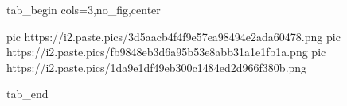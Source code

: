  
 
 
 
 


\ifcmt
  tab_begin cols=3,no_fig,center

     pic https://i2.paste.pics/3d5aacb4f4f9e57ea98494e2ada60478.png
		 pic https://i2.paste.pics/fb9848eb3d6a95b53e8abb31a1e1fb1a.png
		 pic https://i2.paste.pics/1da9e1df49eb300c1484ed2d966f380b.png

  tab_end
\fi
